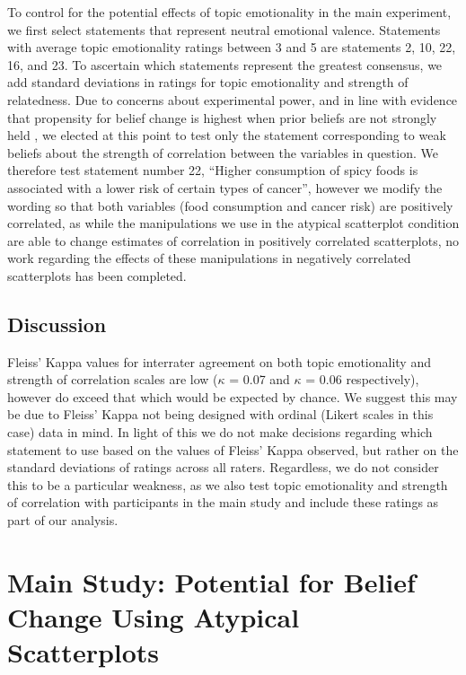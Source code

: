 \documentclass[manuscript,screen,review,anonymous]{acmart}
\begin{document}
To control for the potential effects of topic emotionality in the main
experiment, we first select statements that represent neutral emotional
valence. Statements with average topic emotionality ratings between 3
and 5 are statements 2, 10, 22, 16, and 23. To ascertain which
statements represent the greatest consensus, we add standard deviations
in ratings for topic emotionality and strength of relatedness. Due to
concerns about experimental power, and in line with evidence that
propensity for belief change is highest when prior beliefs are not
strongly held \citep{xiong_2022, markant_2023}, we elected at this point
to test only the statement corresponding to weak beliefs about the
strength of correlation between the variables in question. We therefore
test statement number 22, ``Higher consumption of spicy foods is
associated with a lower risk of certain types of cancer'', however we
modify the wording so that both variables (food consumption and cancer
risk) are positively correlated, as while the manipulations we use in
the atypical scatterplot condition are able to change estimates of
correlation in positively correlated scatterplots, no work regarding the
effects of these manipulations in negatively correlated scatterplots has
been completed.

\subsection{Discussion}\label{sec-discussion-pre}

Fleiss' Kappa values for interrater agreement on both topic emotionality
and strength of correlation scales are low (\(\kappa\) = 0.07 and
\(\kappa\) = 0.06 respectively), however do exceed that which would be
expected by chance. We suggest this may be due to Fleiss' Kappa not
being designed with ordinal (Likert scales in this case) data in mind.
In light of this we do not make decisions regarding which statement to
use based on the values of Fleiss' Kappa observed, but rather on the
standard deviations of ratings across all raters. Regardless, we do not
consider this to be a particular weakness, as we also test topic
emotionality and strength of correlation with participants in the main
study and include these ratings as part of our analysis.

\section{Main Study: Potential for Belief Change Using Atypical
Scatterplots}\label{sec-main-study}
\end{document}
